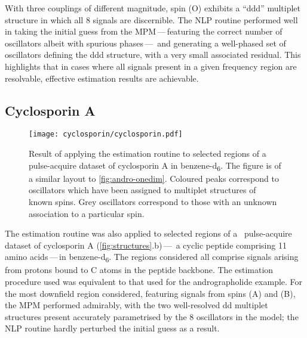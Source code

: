 With three couplings of different magnitude, spin (O) exhibits a ``ddd''
multiplet structure in which all 8 signals are discernible. The \ac{NLP}
routine performed well in taking the initial guess from the
\ac{MPM}\,---\,featuring the correct number of oscillators albeit with
spurious phases\,---\, and generating a well-phased set of oscillators defining
the ddd structure, with a very small associated residual. This highlights that
in cases where all signals present in a given frequency region are resolvable,
effective estimation results are achievable.

\subsection{Cyclosporin A}
\label{subsec:cyclo}
\begin{figure}
    \texttt{[image: cyclosporin/cyclosporin.pdf]}
    \caption[
        Result of applying the estimation routine to selected regions of a
        pulse-acquire dataset of cyclosporin A.
    ]{
        Result of applying the estimation routine to selected regions of a
        pulse-acquire dataset of cyclosporin A in benzene-d\textsubscript{6}.
        The figure is of a similar layout to \cref{fig:andro-onedim}.
        Coloured peaks correspond to oscillators which have been assigned
        to multiplet structures of known spins. Grey oscillators correspond to
        those with an unknown association to a particular spin.
    }
    \label{fig:cyclosporin}
\end{figure}
The estimation routine was also applied to selected regions of a
\proton\ pulse-acquire dataset of cyclosporin A
(\cref{fig:structures}.b)\,---\, a cyclic peptide comprising 11 amino
acids\,---\,in
benzene-d\textsubscript{6}.
The regions considered all comprise
signals arising from protons bound to C\textsuperscript{\textalpha} atoms in
the peptide backbone\cite{Verma2018}.
The estimation procedure used was equivalent to
that used for the andrographolide example. For the most downfield region
considered, featuring signals from spins (A) and (B), the \ac{MPM} performed
admirably, with the two well-resolved dd multiplet structures present
accurately parametrised by the 8 oscillators in the model; the \ac{NLP} routine
hardly perturbed the initial guess as a result.

